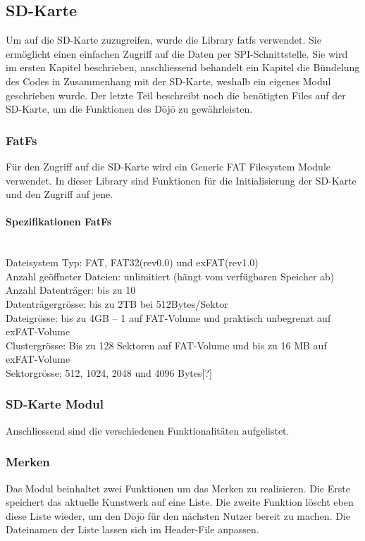\subsection{SD-Karte}\label{sec:sdKarte}
Um auf die SD-Karte zuzugreifen, wurde die Library fatfs verwendet. Sie ermöglicht einen einfachen Zugriff auf die Daten per SPI-Schnittstelle. Sie wird im ersten Kapitel beschrieben, anschliessend behandelt ein Kapitel die Bündelung des Codes in Zusammenhang mit der SD-Karte, weshalb ein eigenes Modul geschrieben wurde. Der letzte Teil beschreibt noch die benötigten Files auf der SD-Karte, um die Funktionen des Dōjō zu gewährleisten.

\subsubsection{FatFs}
Für den Zugriff auf die SD-Karte wird ein Generic FAT Filesystem Module verwendet. In dieser Library sind Funktionen für die Initialisierung der SD-Karte und den Zugriff auf jene. 

\paragraph{Spezifikationen FatFs}$~~$\\
Dateisystem Typ: FAT, FAT32(rev0.0) und exFAT(rev1.0)\\
Anzahl geöffneter Dateien: unlimitiert (hängt vom verfügbaren Speicher ab)\\
Anzahl Datenträger: bis zu 10\\
Datenträgergrösse: bis zu 2TB bei 512Bytes/Sektor\\
Dateigrösse: bis zu 4GB – 1 auf FAT-Volume und praktisch unbegrenzt auf exFAT-Volume\\
Clustergrösse: Bis zu 128 Sektoren auf FAT-Volume und bis zu 16 MB auf exFAT-Volume	\\
Sektorgrösse:  512, 1024, 2048 und 4096 Bytes[?]\\ 


\subsubsection{SD-Karte Modul}
Anschliessend sind die verschiedenen Funktionalitäten aufgelistet.

\subsubsection*{Merken}
Das Modul beinhaltet zwei Funktionen um das Merken zu realisieren. Die Erste speichert das aktuelle Kunstwerk auf eine Liste. Die zweite Funktion löscht eben diese Liste wieder, um den Dōjō für den nächsten Nutzer bereit zu machen. Die Dateinamen der Liste lassen sich im Header-File anpassen.

